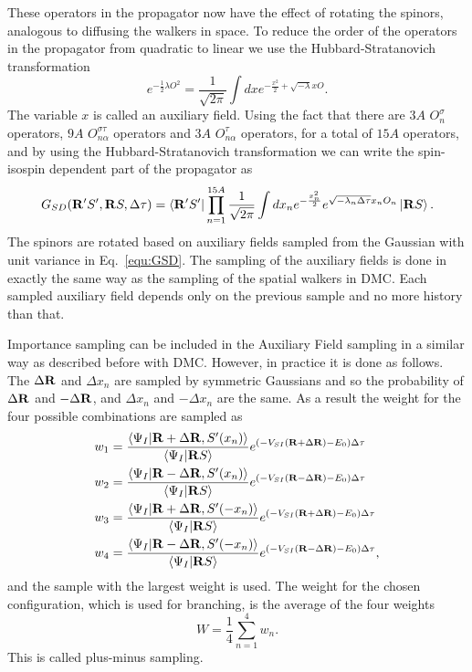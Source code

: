 These operators in the propagator now have the effect of rotating the spinors, analogous to diffusing the walkers in space. To reduce the order of the operators in the propagator from quadratic to linear we use the Hubbard-Stratanovich transformation
\begin{equation}
   e^{-\frac{1}{2}\lambda O^2} = \frac{1}{\sqrt{2\pi}} \int dx e^{-\frac{x^2}{2} + \sqrt{-\lambda}x O}.
\end{equation}
The variable $x$ is called an auxiliary field. Using the fact that there are $3A$ $O_{n}^{\sigma}$ operators, $9A$ $O_{n\alpha}^{\sigma\tau}$ operators and $3A$ $O_{n\alpha}^{\tau}$ operators, for a total of $15A$ operators, and by using the Hubbard-Stratanovich transformation we can write the spin-isospin dependent part of the propagator as
\begin{equation}
   G_{SD}(\mathbf{R}'S',\mathbf{R} S,\Delta\tau) = \left< \mathbf{R}'S' \right|\prod\limits_{n=1}^{15A}\frac{1}{\sqrt{2\pi}}\int dx_n e^{-\frac{x_n^2}{2}}e^{\sqrt{-\lambda_n\Delta\tau} x_nO_n}\left| \mathbf{R} S \right>.
   \label{equ:GSD}
\end{equation}
The spinors are rotated based on auxiliary fields sampled from the Gaussian with unit variance in Eq.~\ref{equ:GSD}. The sampling of the auxiliary fields is done in exactly the same way as the sampling of the spatial walkers in DMC. Each sampled auxiliary field depends only on the previous sample and no more history than that.

Importance sampling can be included in the Auxiliary Field sampling in a similar way as described before with DMC. However, in practice it is done as follows. The $\Delta \mathbf{R}$ and $\Delta x_n$ are sampled by symmetric Gaussians and so the probability of $\Delta \mathbf{R}$ and $-\Delta \mathbf{R}$, and $\Delta x_n$ and $-\Delta x_n$ are the same. As a result the weight for the four possible combinations are sampled as
\begin{align}
   w_1 &= \frac{\left< \Psi_I | \mathbf{R}+\Delta \mathbf{R}, S'(x_n) \right>}{\left< \Psi_I | \mathbf{R} S \right>} e^{\left(-V_{SI}(\mathbf{R}+\Delta\mathbf{R}) - E_0\right)\Delta\tau} \\
   w_2 &= \frac{\left< \Psi_I | \mathbf{R}-\Delta \mathbf{R}, S'(x_n) \right>}{\left< \Psi_I | \mathbf{R} S \right>} e^{\left(-V_{SI}(\mathbf{R}-\Delta\mathbf{R}) - E_0\right)\Delta\tau} \\
   w_3 &= \frac{\left< \Psi_I | \mathbf{R}+\Delta \mathbf{R}, S'(-x_n) \right>}{\left< \Psi_I | \mathbf{R} S \right>} e^{\left(-V_{SI}(\mathbf{R}+\Delta\mathbf{R}) - E_0\right)\Delta\tau} \\
   w_4 &= \frac{\left< \Psi_I | \mathbf{R}-\Delta \mathbf{R}, S'(-x_n) \right>}{\left< \Psi_I | \mathbf{R} S \right>} e^{\left(-V_{SI}(\mathbf{R}-\Delta\mathbf{R}) - E_0\right)\Delta\tau},
\end{align}
and the sample with the largest weight is used. The weight for the chosen configuration, which is used for branching, is the average of the four weights
\begin{equation}
   W = \frac{1}{4}\sum\limits_{n=1}^4 w_n.
\end{equation}
This is called plus-minus sampling.

